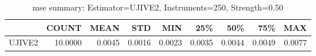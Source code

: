 \begin{table}[ht]
\centering
\caption{mse summary: Estimator=UJIVE2, Instruments=250, Strength=0.50}
\begin{tabular}{lrrrrrrrr}
\toprule
 & COUNT & MEAN & STD & MIN & 25\% & 50\% & 75\% & MAX \\
\midrule
UJIVE2 & 10.0000 & 0.0045 & 0.0016 & 0.0023 & 0.0035 & 0.0044 & 0.0049 & 0.0077 \\
\bottomrule
\end{tabular}
\end{table}
